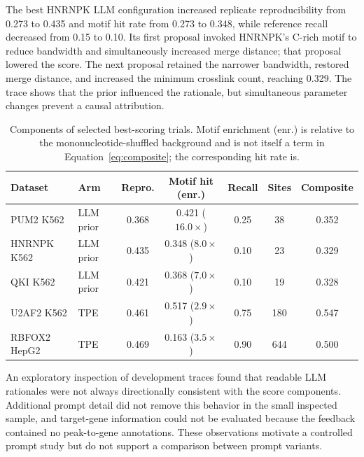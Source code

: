 The best HNRNPK LLM configuration increased replicate reproducibility from 0.273
to 0.435 and motif hit rate from 0.273 to 0.348, while reference recall decreased
from 0.15 to 0.10. Its first proposal invoked HNRNPK's C-rich motif to reduce
bandwidth and simultaneously increased merge distance; that proposal lowered
the score. The next proposal retained the narrower bandwidth, restored merge
distance, and increased the minimum crosslink count, reaching 0.329. The trace
shows that the prior influenced the rationale, but simultaneous parameter
changes prevent a causal attribution.

\begin{table}[H]
\centering
\small
\begin{tabular}{@{}llccccc@{}}
\toprule
Dataset & Arm & Repro. & Motif hit (enr.) & Recall & Sites & Composite \\
\midrule
PUM2 K562   & LLM prior & 0.368 & 0.421 ($16.0\times$) & 0.25 & 38  & 0.352 \\
HNRNPK K562 & LLM prior & 0.435 & 0.348 ($8.0\times$)  & 0.10 & 23  & 0.329 \\
QKI K562    & LLM prior & 0.421 & 0.368 ($7.0\times$)  & 0.10 & 19  & 0.328 \\
U2AF2 K562  & TPE       & 0.461 & 0.517 ($2.9\times$)  & 0.75 & 180 & 0.547 \\
RBFOX2 HepG2& TPE       & 0.469 & 0.163 ($3.5\times$)  & 0.90 & 644 & 0.500 \\
\bottomrule
\end{tabular}
\caption{Components of selected best-scoring trials. Motif enrichment (enr.) is
relative to the mononucleotide-shuffled background and is not itself a term in
Equation~\ref{eq:composite}; the corresponding hit rate is.}
\label{tab:bio}
\end{table}

An exploratory inspection of development traces found that readable LLM
rationales were not always directionally consistent with the score components.
Additional prompt detail did not remove this behavior in the small inspected
sample, and target-gene information could not be evaluated because the feedback
contained no peak-to-gene annotations. These observations motivate a controlled
prompt study but do not support a comparison between prompt variants.
